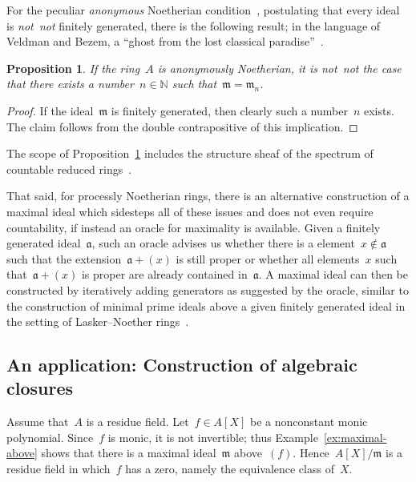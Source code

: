 \documentclass[com,11pt,crcready]{iosart2x}
\theoremstyle{definition}
\theoremstyle{plain}
\newtheorem{proposition}[definition]{Proposition}
\theoremstyle{remark}
\newcommand{\?}{\,{:}\,}
\newcommand{\aaa}{\mathfrak{a}}
\newcommand{\mmm}{\mathfrak{m}}
\newcommand{\NN}{\mathbb{N}}
\renewcommand{\_}{\mathpunct{.}\,}
\begin{document}
For the peculiar \emph{anonymous} Noetherian condition~\cite[Definition~3.27]{blechschmidt:phd}, postulating that every
ideal is \emph{not~not} finitely generated, there is the following result;
in the language of Veldman and Bezem, a ``ghost from the lost classical
paradise''~\cite[Section~5.1]{veldman-bezem:ramsey}.

\begin{proposition}\label{prop:fin-anon}If the ring~$A$ is anonymously
Noetherian, it is \emph{not~not} the case that there exists a number~$n \in
\NN$ such that~$\mmm = \mmm_n$.\end{proposition}

\begin{proof}If the ideal~$\mmm$ is finitely generated, then clearly such a
number~$n$ exists. The claim follows from the double contrapositive of this
implication.
\end{proof}

The scope of Proposition~\ref{prop:fin-anon} includes the structure sheaf of
the spectrum of countable reduced
rings~\cite[Proposition~34]{blechschmidt:generalized-spaces}.

That said, for processly Noetherian rings, there is an alternative
construction of a maximal ideal which sidesteps all of these issues and does
not even require countability, if instead an oracle for maximality is available.
Given a finitely generated ideal~$\aaa$, such an oracle advises us whether there is a
element~$x \not\in \aaa$ such that the extension~$\aaa + (x)$ is still proper
or whether all elements~$x$ such that~$\aaa + (x)$ is proper are already
contained in~$\aaa$. A maximal ideal can then be constructed by iteratively
adding generators as suggested by the oracle, similar to the construction of
minimal prime ideals above a given finitely generated ideal in the setting of
Lasker--Noether rings~\cite[Theorem~E]{perdry:noetherian}.


\subsection{An application: Construction of algebraic closures}

Assume that~$A$ is a residue field. Let~$f \in A[X]$ be a nonconstant monic
polynomial. Since~$f$ is monic, it is not invertible; thus
Example~\ref{ex:maximal-above} shows that there is a maximal ideal~$\mmm$
above~$(f)$. Hence~$A[X]/\mmm$ is a residue field in which~$f$ has a zero, namely the equivalence class of~$X$.
\end{document}
